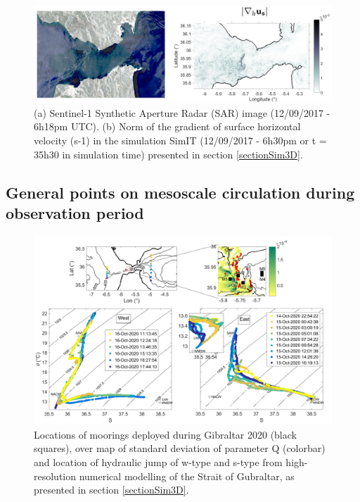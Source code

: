 \begin{figure}[!h]
 \includegraphics[width=\textwidth]{./GBR3D/Comp_SAR_IES.png}
 \caption {(a) Sentinel-1 Synthetic Aperture Radar (SAR) image (12/09/2017 - 6h18pm UTC). (b) Norm of the gradient of surface horizontal velocity (s-1) in the simulation SimIT (12/09/2017 - 6h30pm or t = 35h30 in simulation time) presented in section \ref{sectionSim3D}.}
 \label{fig_SARIES}
\end{figure}




\subsection{General points on mesoscale circulation during observation period}

\begin{figure}[!h]
 \includegraphics[width=\textwidth]{./GBR3D/Fig_Moor.png}
 \caption {Locations of moorings deployed during Gibraltar 2020 (black squares), over map of standard deviation of parameter Q (colorbar) and location of hydraulic jump of w-type and s-type from high-resolution numerical modelling of the Strait of Gubraltar, as presented in section \ref{sectionSim3D}.}
 \label{fig_moor}
\end{figure}


